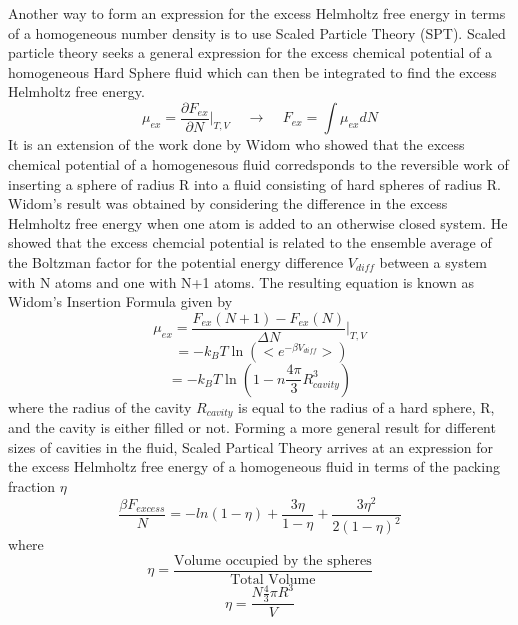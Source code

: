 \documentclass[12pt]{article}
\begin{document}
Another way to form an expression for the excess Helmholtz free energy in terms of a homogeneous number density is to use Scaled Particle Theory (SPT).
Scaled particle theory seeks a general expression for the excess chemical potential of a homogeneous Hard Sphere fluid which can then be integrated to find the excess Helmholtz free energy.
\begin{equation}\mu_{ex}=\frac{\partial{F_{ex}}}{\partial{N}}\bigg|_{T,V}{~~~~~}\rightarrow{~~~~~}F_{ex}=\int{\mu_{ex}dN}\end{equation}
It is an extension of the work done by Widom who showed that the excess chemical potential of a homogenesous fluid corredsponds to the reversible work 
of inserting a sphere of radius R into a fluid consisting of hard spheres of radius R. 
Widom's result was obtained by considering the difference in the excess Helmholtz free energy when one atom is added to an otherwise closed system. 
He showed that the excess chemcial potential is related to the ensemble average of the Boltzman factor for the potential energy difference $V_{diff}$ 
between a system with N atoms and one with N+1 atoms. The resulting equation is known as Widom's Insertion Formula given by
\begin{equation}\mu_{ex}=\frac{F_{ex}(N+1)-F_{ex}(N)}{\Delta{N}}\bigg|_{T,V}\end{equation}
\begin{equation}\label{widoms-insertion-formula}{~}=-k_BT\ln\left(<e^{-\beta{V_{diff}}}>\right)\end{equation}
\color{red} \begin{equation}=-k_BT\ln(1-n\frac{4\pi}{3}R_{cavity}^3)\end{equation}
where the radius of the cavity $R_{cavity}$ is equal to the radius of a hard sphere, R, and the cavity is either filled or not. \color{black}%
Forming a more general result for different sizes of cavities in the fluid, Scaled Partical Theory arrives at an expression for the excess Helmholtz free energy of a homogeneous fluid in terms of the packing fraction $\eta$ 
\begin{equation}\label{Fexcess-SPT}{\frac{\beta{F_{excess}}}{N}=-ln(1-\eta)+\frac{3\eta}{1-\eta}+\frac{3{\eta}^2}{2(1-\eta)^2}}\end{equation} 
where
\begin{equation}{\eta = \frac{\mbox{Volume occupied by the spheres}}{\mbox{Total Volume}}}\end{equation}
\begin{equation}{\eta = \frac{N\frac{4}{3}\pi{R^3}}{V}}\end{equation}
\end{document}

